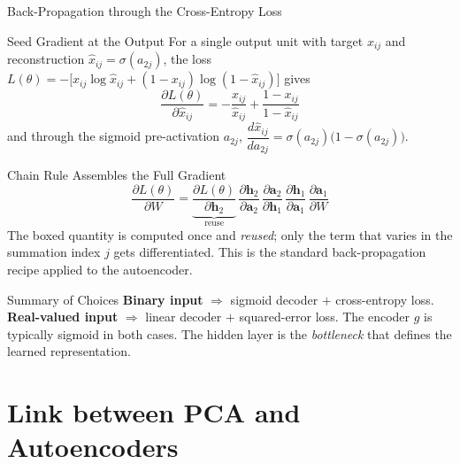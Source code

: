 \documentclass{beamer}
\begin{document}
\begin{frame}[shrink=10]{Back-Propagation through the Cross-Entropy Loss}
  \begin{block}{Seed Gradient at the Output}
    For a single output unit with target $x_{ij}$ and reconstruction
    $\hat{x}_{ij}=\sigma(a_{2j})$, the loss
    $L(\theta)=-\bigl[x_{ij}\log\hat{x}_{ij}+(1-x_{ij})\log(1-\hat{x}_{ij})\bigr]$
    gives
    \[
      \frac{\partial L(\theta)}{\partial \hat{x}_{ij}}
        = -\frac{x_{ij}}{\hat{x}_{ij}}
          + \frac{1-x_{ij}}{1-\hat{x}_{ij}}
    \]
    and through the sigmoid pre-activation $a_{2j}$,
    $\dfrac{d\hat{x}_{ij}}{d a_{2j}} = \sigma(a_{2j})\bigl(1-\sigma(a_{2j})\bigr)$.
  \end{block}

  \begin{block}{Chain Rule Assembles the Full Gradient}
    \[
      \frac{\partial L(\theta)}{\partial W}
        = \underbrace{\frac{\partial L(\theta)}{\partial \mathbf{h}_2}}_{\text{reuse}}
          \,\frac{\partial \mathbf{h}_2}{\partial \mathbf{a}_2}
          \,\frac{\partial \mathbf{a}_2}{\partial \mathbf{h}_1}
          \,\frac{\partial \mathbf{h}_1}{\partial \mathbf{a}_1}
          \,\frac{\partial \mathbf{a}_1}{\partial W}
    \]
    The boxed quantity is computed once and \emph{reused};
    only the term that varies in the summation index $j$ gets
    differentiated. This is the standard back-propagation recipe applied
    to the autoencoder.
  \end{block}

  \begin{alertblock}{Summary of Choices}
    \textbf{Binary input} $\Rightarrow$ sigmoid decoder $+$ cross-entropy loss.\quad
    \textbf{Real-valued input} $\Rightarrow$ linear decoder $+$ squared-error loss.
    The encoder $g$ is typically sigmoid in both cases. The hidden layer is the
    \emph{bottleneck} that defines the learned representation.
  \end{alertblock}
\end{frame}

\section{Link between PCA and Autoencoders}
\end{document}
